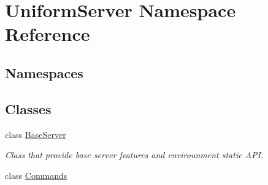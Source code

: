 \hypertarget{namespace_uniform_server}{}\section{Uniform\+Server Namespace Reference}
\label{namespace_uniform_server}
\subsection*{Namespaces}
\begin{DoxyCompactItemize}
\end{DoxyCompactItemize}
\subsection*{Classes}
\begin{DoxyCompactItemize}
\item 
class \mbox{\hyperlink{class_uniform_server_1_1_base_server}{Base\+Server}}
\begin{DoxyCompactList}\small\item\em Class that provide base server features and envirounment static A\+PI. \end{DoxyCompactList}\item 
class \mbox{\hyperlink{class_uniform_server_1_1_commands}{Commands}}
\end{DoxyCompactItemize}
